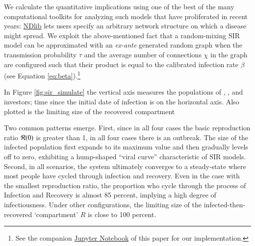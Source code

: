 We calculate the quantitative implications using one of the best of the many computational toolkits for analyzing such models that have proliferated in recent years:  %
\href{https://ndlib.readthedocs.io/en/latest/}{NDlib} lets users specify an arbitrary network structure on which a disease might spread. We exploit the above-mentioned fact that a random-mixing SIR model can be approximated with an \textit{ex-ante} generated random graph when the transmission probability $\tau$ and the average number of connections $\chi$ in the graph are configured such that their product is equal to the calibrated infection rate $\beta$ (see Equation \ref{eq:beta}).\footnote{See the companion \href{https://github.com/llorracc/EpiExp/blob/master/SIR_Ndlib.ipynb}{Jupyter Notebook} of this paper for our  implementation.}

In Figure \ref{fig:sir_simulate} the vertical axis measures the populations of {\Susceptible}, {\Infected}, and {\Recovered} investors; time since the initial date of infection is on the horizontal axis.  Also plotted is the limiting size of the recovered compartment %

Two common patterns emerge.  First, since in all four cases the basic reproduction ratio $\mathcal{R}(0)$ is greater than 1, in all four cases there is an outbreak. The size of the infected population first expands to its maximum value and then gradually levels off to zero, exhibiting a hump-shaped ``viral curve'' characteristic of SIR models.  Second, in all scenarios, the system ultimately converges to a steady-state where most people have cycled through infection and recovery. Even in the case with the smallest reproduction ratio, the proportion who cycle through the process of Infection and Recovery is almost 85 percent, implying a high degree of infectiousness. Under other configurations, the limiting size of the infected-then-recovered `compartment' $R$ is close to 100 percent.

